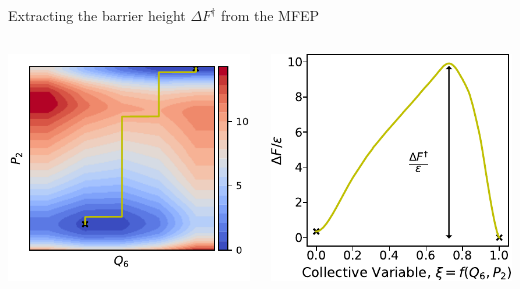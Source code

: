 \documentclass[aspectratio=169]{beamer}
\begin{document}
\begin{frame}[c]{Extracting the barrier height $\Delta F^{\dagger}$ from the MFEP}

  \begin{columns}[T, onlytextwidth]


    \centering
    \vspace{-0.5\baselineskip}
    \includegraphics[width=\textwidth]{figs/subfig-pathway_10p25_small.pdf}


    \centering
    \includegraphics[width=\textwidth]{../figures/old_fig-pathway_10p25/subfig-2d_barrier_10p25_small.pdf}


\end{columns}
\end{frame}
\end{document}

